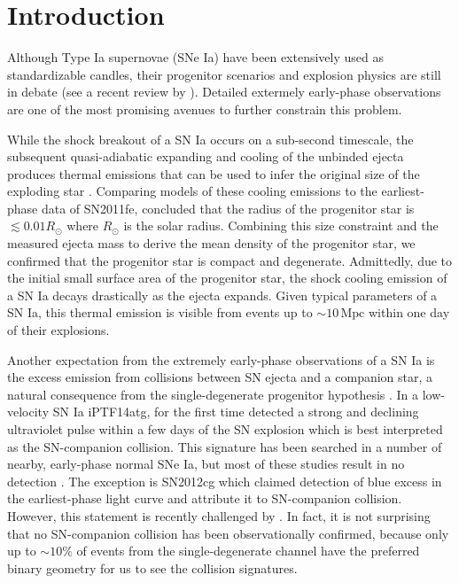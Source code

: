 \documentclass[twocolumn]{aastex61}
\newcommand{\sr}{R_\odot}
\begin{document}

\section{Introduction}
\label{sec:intro}

Although Type Ia supernovae (SNe Ia) have been extensively used as
standardizable candles, their progenitor scenarios and explosion
physics are still in debate (see a recent review by
\citealt{2014ARA&A..52..107M}). Detailed extermely early-phase
observations are one of the most promising avenues to further
constrain this problem.

While the shock breakout of a SN Ia occurs on a sub-second timescale,
the subsequent quasi-adiabatic expanding and cooling of the unbinded
ejecta produces thermal emissions that can be used to infer the
original size of the exploding star
\citep{2010ApJ...708..598P,2011ApJ...728...63R}. Comparing models of
these cooling emissions to the earliest-phase data of SN2011fe,
\citet{2012ApJ...744L..17B} concluded that the radius of the
progenitor star is $\lesssim0.01\sr$ where $\sr$ is the solar
radius. Combining this size constraint and the measured ejecta mass to
derive the mean density of the progenitor star, we confirmed that the
progenitor star is compact and degenerate. Admittedly, due to the
initial small surface area of the progenitor star, the shock cooling
emission of a SN Ia decays drastically as the ejecta expands. Given
typical parameters of a SN Ia, this thermal emission is visible from
events up to $\sim 10\,\textrm{Mpc}$ within one day of their explosions.

Another expectation from the extremely early-phase observations of a
SN Ia is the excess emission from collisions between SN ejecta and a
companion star, a natural consequence from the single-degenerate
progenitor hypothesis \citep{1973ApJ...186.1007W,2010ApJ...708.1025K}.
In a low-velocity SN Ia iPTF14atg, \citet{2015Natur.521..328C} for the
first time detected a strong and declining ultraviolet pulse within a
few days of the SN explosion which is best interpreted as the
SN-companion collision. This signature has been searched in a number
of nearby, early-phase normal SNe Ia, but most of these studies result
in no detection
\citep{2010ApJ...722.1691H,2011ApJ...741...20B,2012ApJ...744...38F,
  2012ApJ...744L..17B,2015Natur.521..332O,
  2013ApJ...778L..15Z,2015ApJ...799..106G,2016ApJ...826..144S,
  2015ApJS..221...22I}. The exception is SN2012cg which
\citet{2016ApJ...820...92M} claimed detection of blue excess in the
earliest-phase light curve and attribute it to SN-companion collision.
However, this statement is recently challenged by
\citet{2016arXiv161007601S}. In fact, it is not surprising that no
SN-companion collision has been observationally confirmed, because
only up to $\sim 10\%$ of events from the single-degenerate channel
have the preferred binary geometry for us to see the collision
signatures.
\end{document}
